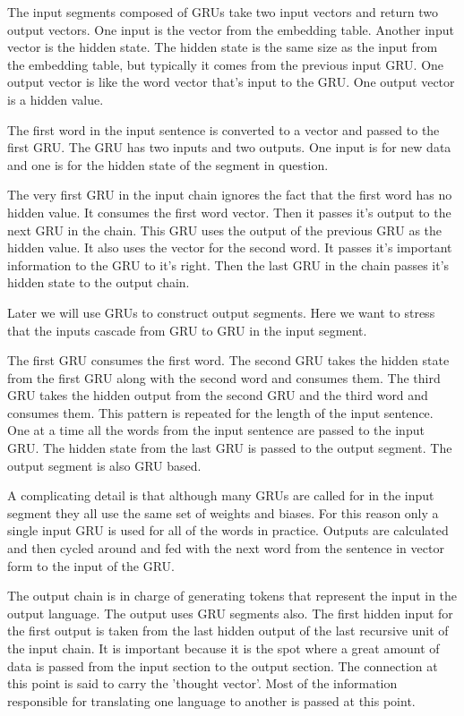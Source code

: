 The input segments composed of GRUs take two input vectors and return two output vectors. One input is the vector from the embedding table. Another input vector is the hidden state. The hidden state is the same size as the input from the embedding table, but typically it comes from the previous input GRU. One output vector is like the word vector that's input to the GRU. One output vector is a hidden value.

The first word in the input sentence is converted to a vector and passed to the first GRU. The GRU has two inputs and two outputs. One input is for new data and one is for the hidden state of the segment in question. 

The very first GRU in the input chain ignores the fact that the first word has no hidden value. It consumes the first word vector. Then it passes it's output to the next GRU in the chain. This GRU uses the output of the previous GRU as the hidden value. It also uses the vector for the second word. It passes it's important information to the GRU to it's right. Then the last GRU in the chain passes it's hidden state to the output chain.

Later we will use GRUs to construct output segments. Here we want to stress that the inputs cascade from GRU to GRU in the input segment. 

The first GRU consumes the first word. The second GRU takes the hidden state from the first GRU along with the second word and consumes them. The third GRU takes the hidden output from the second GRU and the third word and consumes them. This pattern is repeated for the length of the input sentence. One at a time all the words from the input sentence are passed to the input GRU. The hidden state from the last GRU is passed to the output segment. The output segment is also GRU based.

A complicating detail is that although many GRUs are called for in the input segment they all use the same set of weights and 
biases. For this reason only a single input GRU is used for all of the words in practice. Outputs are calculated and then cycled around and fed with the next word from the sentence in vector form to the input of the GRU. 


The output chain is in charge of generating tokens that represent the input in the output language. The output uses GRU segments also. The first hidden input for the first output is taken from the 
last hidden output of the last recursive unit of the input chain. It is important because it is the spot where a great amount of data is passed from the input section to the output section. 
The connection at this point is said to carry the 'thought vector'. Most of the information responsible for translating one language to another is passed at this point.

